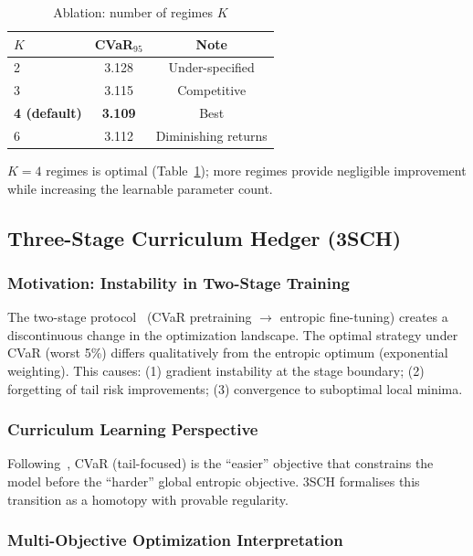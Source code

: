 \begin{table}[t]
\centering
\caption{Ablation: number of regimes $K$}
\label{tab:ablation_regimes}
\small
\begin{tabular}{lcc}
\toprule
\textbf{$K$} & \textbf{CVaR$_{95}$} & \textbf{Note} \\
\midrule
2 & 3.128 & Under-specified \\
3 & 3.115 & Competitive \\
\textbf{4 (default)} & \textbf{3.109} & Best \\
6 & 3.112 & Diminishing returns \\
\bottomrule
\end{tabular}
\end{table}

$K = 4$ regimes is optimal (Table~\ref{tab:ablation_regimes}); more regimes provide negligible improvement while increasing the learnable parameter count.

\subsection{Three-Stage Curriculum Hedger (3SCH)}
\label{sec:3sch}

\subsubsection{Motivation: Instability in Two-Stage Training}

The two-stage protocol~\citep{kozyra2019deep} (CVaR pretraining $\to$ entropic fine-tuning) creates a discontinuous change in the optimization landscape. The optimal strategy under CVaR (worst 5\%) differs qualitatively from the entropic optimum (exponential weighting). This causes: (1) gradient instability at the stage boundary; (2) forgetting of tail risk improvements; (3) convergence to suboptimal local minima.

\subsubsection{Curriculum Learning Perspective}

Following~\citet{bengio2009curriculum}, CVaR (tail-focused) is the ``easier'' objective that constrains the model before the ``harder'' global entropic objective. 3SCH formalises this transition as a homotopy with provable regularity.

\subsubsection{Multi-Objective Optimization Interpretation}

